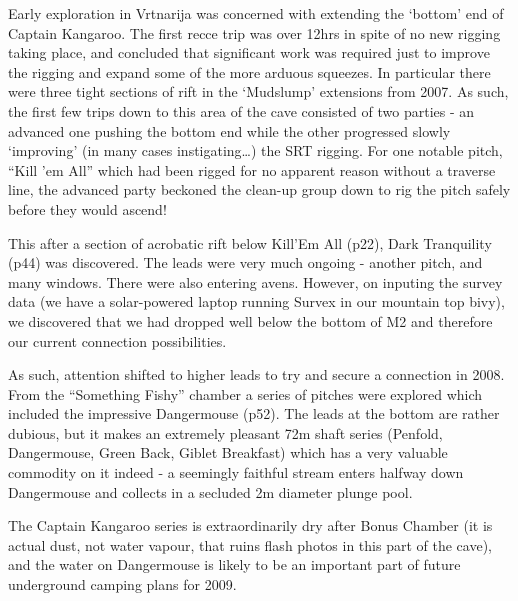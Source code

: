 Early exploration in Vrtnarija was concerned with extending the `bottom'
end of Captain Kangaroo. The first recce trip was over 12hrs in spite of
no new rigging taking place, and concluded that significant work was
required just to improve the rigging and expand some of the more arduous
squeezes. In particular there were three tight sections of rift in the
`Mudslump' extensions from 2007. As such, the first few trips down to
this area of the cave consisted of two parties - an advanced one pushing
the bottom end while the other progressed slowly `improving' (in many
cases instigating\ldots{}) the SRT rigging. For one notable pitch,
``Kill 'em All'' which had been rigged for no apparent reason without a
traverse line, the advanced party beckoned the clean-up group down to
rig the pitch safely before they would ascend!

This after a section of acrobatic rift below Kill'Em All (p22), Dark
Tranquility (p44) was discovered. The leads were very much ongoing -
another pitch, and many windows. There were also entering avens.
However, on inputing the survey data (we have a solar-powered laptop
running Survex in our mountain top bivy), we discovered that we had
dropped well below the bottom of M2 and therefore our current connection
possibilities.

As such, attention shifted to higher leads to try and secure a
connection in 2008. From the ``Something Fishy'' chamber a series of
pitches were explored which included the impressive Dangermouse (p52).
The leads at the bottom are rather dubious, but it makes an extremely
pleasant 72m shaft series (Penfold, Dangermouse, Green Back, Giblet
Breakfast) which has a very valuable commodity on it indeed - a
seemingly faithful stream enters halfway down Dangermouse and collects
in a secluded 2m diameter plunge pool.

The Captain Kangaroo series is extraordinarily dry after Bonus Chamber
(it is actual dust, not water vapour, that ruins flash photos in this
part of the cave), and the water on Dangermouse is likely to be an
important part of future underground camping plans for 2009.

